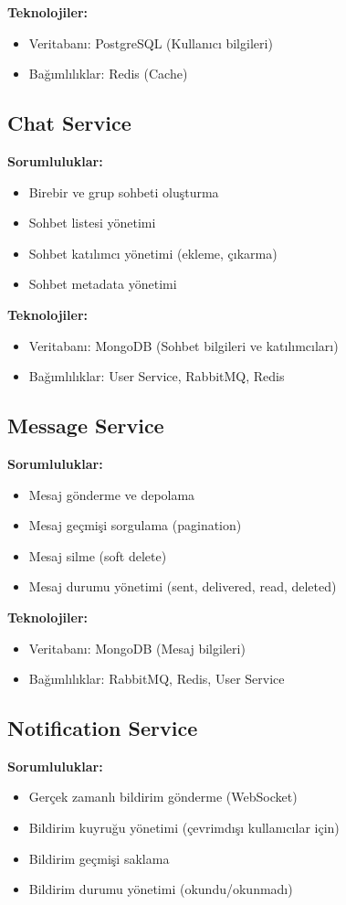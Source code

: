 \textbf{Teknolojiler:}
\begin{itemize}
    \item Veritabanı: PostgreSQL (Kullanıcı bilgileri)
    \item Bağımlılıklar: Redis (Cache)
\end{itemize}

\subsection{Chat Service}
\textbf{Sorumluluklar:}
\begin{itemize}
    \item Birebir ve grup sohbeti oluşturma
    \item Sohbet listesi yönetimi
    \item Sohbet katılımcı yönetimi (ekleme, çıkarma)
    \item Sohbet metadata yönetimi
\end{itemize}

\textbf{Teknolojiler:}
\begin{itemize}
    \item Veritabanı: MongoDB (Sohbet bilgileri ve katılımcıları)
    \item Bağımlılıklar: User Service, RabbitMQ, Redis
\end{itemize}

\subsection{Message Service}
\textbf{Sorumluluklar:}
\begin{itemize}
    \item Mesaj gönderme ve depolama
    \item Mesaj geçmişi sorgulama (pagination)
    \item Mesaj silme (soft delete)
    \item Mesaj durumu yönetimi (sent, delivered, read, deleted)
\end{itemize}

\textbf{Teknolojiler:}
\begin{itemize}
    \item Veritabanı: MongoDB (Mesaj bilgileri)
    \item Bağımlılıklar: RabbitMQ, Redis, User Service
\end{itemize}

\subsection{Notification Service}
\textbf{Sorumluluklar:}
\begin{itemize}
    \item Gerçek zamanlı bildirim gönderme (WebSocket)
    \item Bildirim kuyruğu yönetimi (çevrimdışı kullanıcılar için)
    \item Bildirim geçmişi saklama
    \item Bildirim durumu yönetimi (okundu/okunmadı)
\end{itemize}

